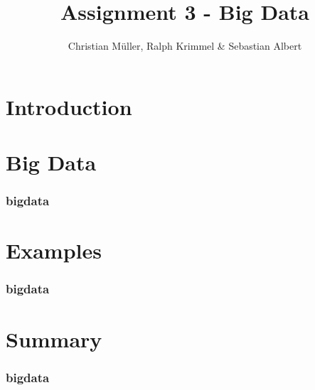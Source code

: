 \documentclass{beamer}
\title{Assignment 3 - Big Data}
\author{Christian Müller, Ralph Krimmel \& Sebastian Albert}
\begin{document}
\section{Introduction}
\begin{frame}
	\maketitle
\end{frame}

\begin{frame}
	\tableofcontents
\end{frame}

\section{Big Data}
\begin{frame}
	\frametitle{bigdata}
\end{frame}

\section{Examples}
\begin{frame}
	\frametitle{bigdata}
\end{frame}

\section{Summary}
\begin{frame}
	\frametitle{bigdata}
\end{frame}
\end{document}
